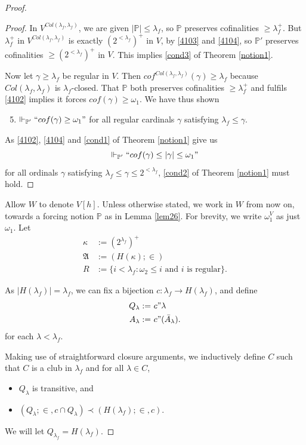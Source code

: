 \documentclass[12pt, twoside]{memoir}
\numberwithin{equation}{section}
\theoremstyle{definition}
\theoremstyle{remark}
\theoremstyle{definition}
\theoremstyle{definition}
\theoremstyle{definition}
\theoremstyle{remark}
\begin{document}
\begin{proof}
\begin{proof}
In $V^{Col(\lambda_f, \lambda_f)}$, we are given $|\mathbb{P}| \leq \lambda_f$, so $\mathbb{P}$ preserves cofinalities $\geq \lambda_f^+$. But $\lambda_f^+$ in $V^{Col(\lambda_f, \lambda_f)}$ is exactly $(2^{< \lambda_f})^+$ in $V$, by \ref{4103} and \ref{4104}, so $\mathbb{P}'$ preserves cofinalities $\geq (2^{< \lambda_f})^+$ in $V$. This implies \ref{cond3} of Theorem  \ref{notion1}.

Now let $\gamma \geq \lambda_f$ be regular in $V$. Then $cof^{Col(\lambda_f, \lambda_f)} (\gamma) \geq \lambda_f$ because $Col(\lambda_f, \lambda_f)$ is $\lambda_f$-closed. That $\mathbb{P}$ both preserves cofinalities $\geq \lambda_f^+$ and fulfils \ref{4102} implies it forces $cof(\gamma) \geq \omega_1$. We have thus shown
\begin{enumerate}[label=(\arabic*')]
    \setcounter{enumi}{4}
    \item\label{4105} $\Vdash_{\mathbb{P}'} ``cof(\gamma) \geq \omega_1"$ for all regular cardinals $\gamma$ satisfying $\lambda_f \leq \gamma$.
\end{enumerate}
As \ref{4102}, \ref{4104} and \ref{cond1} of Theorem \ref{notion1} give us $$\Vdash_{\mathbb{P}'} ``cof(\gamma) \leq |\gamma| \leq \omega_1"$$ for all ordinals $\gamma$ satisfying $\lambda_f \leq \gamma \leq 2^{< \lambda_f}$, \ref{cond2} of Theorem \ref{notion1} must hold.
\end{proof}

Allow $W$ to denote $V[h]$. Unless otherwise stated, we work in $W$ from now on, towards a forcing notion $\mathbb{P}$ as in Lemma \ref{lem26}. For brevity, we write $\omega_1^V$ as just $\omega_1$. Let 
\begin{align*}
    \kappa & := (2^{\lambda_f})^+  \\
    \mathfrak{A} & := (H(\kappa); \in) \\
    R & := \{i < \lambda_f : \omega_2 \leq i \text{ and } i \text{ is regular}\} \text{.}
\end{align*}

As $|H(\lambda_f)| = \lambda_f$, we can fix a bijection $c : \lambda_f \longrightarrow H(\lambda_f)$, and define
\begin{align*}
    Q_{\lambda} := \ & c" \lambda \\
    A_{\lambda} := \ & c" (\bar{A}_{\lambda}) \text{.}
\end{align*}
for each $\lambda < \lambda_f$.

Making use of straightforward closure arguments, we inductively define $C$ such that $C$ is a club in $\lambda_f$ and for all $\lambda \in C$, 
\begin{itemize}
    \item $Q_{\lambda}$ is transitive, and
    \item $(Q_{\lambda}; \in, c \cap Q_{\lambda}) \prec (H(\lambda_f); \in, c)$.
\end{itemize}
We will let $Q_{\lambda_f} = H(\lambda_f)$.


\end{proof}
\end{document}
